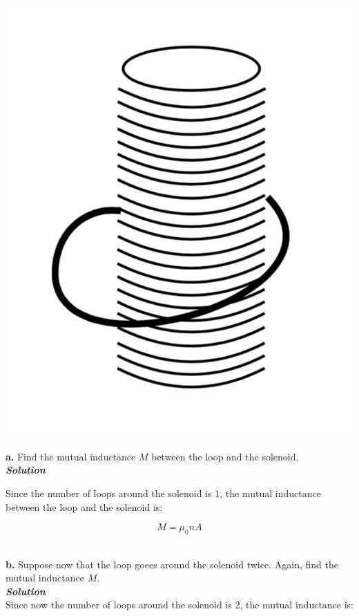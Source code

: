\documentclass[14pt]{extarticle}
\newcommand{\bfit}[1]{\textbf{\textit{#1}}}
\newcommand{\muo}{\mu_0}
\begin{document}
\begin{center}
	\includegraphics[scale=0.3]{ps8-pic2.png}
\end{center}

{\Large \bf a.} Find the mutual inductance $M$ between the loop and the solenoid. \\ 

{\bfit{Solution}} 

Since the number of loops around the solenoid is 1, the mutual inductance between the loop and the solenoid is:

$$M = \muo nA$$ \ 



\dotfill 

\hfill 

{\Large \bf b.} Suppose now that the loop goees around the solenoid twice. Again, find the mutual inductance $M$. \\ 

{\bfit{Solution}} \\ 

Since now the number of loops around the solenoid  is 2, the mutual  inductance is:
\end{document}
